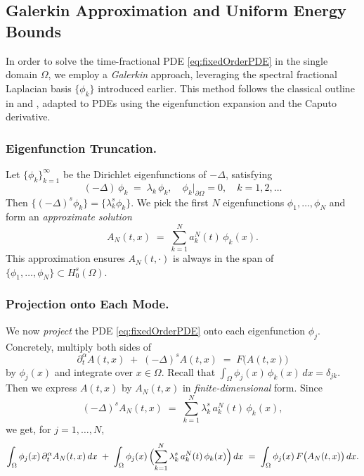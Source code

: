 \documentclass[12pt]{article}
\begin{document}
\subsection{Galerkin Approximation and Uniform Energy Bounds}
\label{subsec:galerkin_singledomain}

In order to solve the time-fractional PDE \eqref{eq:fixedOrderPDE} in the single domain
\(\Omega\), we employ a \emph{Galerkin} approach, leveraging the spectral fractional
Laplacian basis \(\{\phi_k\}\) introduced earlier.  This method follows the classical
outline in \cite[Chapter~7]{Diethelm2010} and \cite[Section~3.3]{Kilbas2006}, adapted
to PDEs using the eigenfunction expansion and the Caputo derivative.

\subsubsection{Eigenfunction Truncation.}
Let \(\{\phi_k\}_{k=1}^\infty\) be the Dirichlet eigenfunctions of \(-\Delta\), satisfying
\[
(-\Delta)\,\phi_k \;=\; \lambda_k\,\phi_k,
\quad
\phi_k\big|_{\partial\Omega}=0,
\quad
k=1,2,\dots
\]
Then \(\{(-\Delta)^s \phi_k\} = \{\lambda_k^s \phi_k\}\).  We pick the first \(N\)
eigenfunctions \(\phi_1,\dots,\phi_N\) and form an \emph{approximate solution}
\[
A_N(t,x)
\;=\;
\sum_{k=1}^N a_k^N(t)\,\phi_k(x).
\]
This approximation ensures \(A_N(t,\cdot)\) is always in the span of
\(\{\phi_1,\dots,\phi_N\}\subset H_0^s(\Omega)\).

\subsubsection{Projection onto Each Mode.}
We now \emph{project} the PDE \eqref{eq:fixedOrderPDE} onto each eigenfunction \(\phi_j\).
Concretely, multiply both sides of
\[
\partial_t^\alpha A(t,x) \;+\; (-\Delta)^s A(t,x) \;=\; F\bigl(A(t,x)\bigr)
\]
by \(\phi_j(x)\) and integrate over \(x\in\Omega\). Recall that
\(\int_\Omega \phi_j(x)\,\phi_k(x)\,dx = \delta_{jk}\).  Then we express \(A(t,x)\)
by \(A_N(t,x)\) in \emph{finite-dimensional} form.  Since
\[
(-\Delta)^s A_N(t,x)
\;=\;
\sum_{k=1}^N \lambda_k^s\,a_k^N(t)\,\phi_k(x),
\]
we get, for \(j=1,\dots,N\),
\[
\int_\Omega
  \phi_j(x)\,\partial_t^\alpha A_N(t,x)
\,dx
\;+\;
\int_\Omega
  \phi_j(x)\,
  \Bigl(\sum_{k=1}^N \lambda_k^s\,a_k^N(t)\,\phi_k(x)\Bigr)\,dx
\;=\;
\int_\Omega
  \phi_j(x)\,F\bigl(A_N(t,x)\bigr)\,dx.
\]
\end{document}
